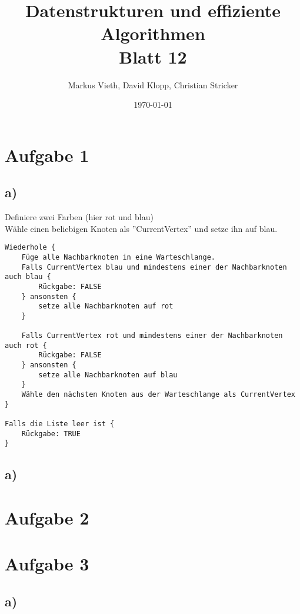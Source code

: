 \documentclass[a4paper,11pt,twoside]{scrartcl}
\title{Datenstrukturen und effiziente Algorithmen\\ Blatt 12}
\author{Markus Vieth, David Klopp, Christian Stricker}
\date{\today}
\begin{document}
\maketitle
\cleardoublepage
\pagestyle{myheadings}

\section*{Aufgabe 1}
\subsection*{a)} 
Definiere zwei Farben (hier rot und blau)\\
Wähle einen beliebigen Knoten als ''CurrentVertex'' und setze ihn auf blau.\\

\begin{lstlisting}
Wiederhole {
	Füge alle Nachbarknoten in eine Warteschlange.
	Falls CurrentVertex blau und mindestens einer der Nachbarknoten auch blau {
		Rückgabe: FALSE
	} ansonsten {
		setze alle Nachbarknoten auf rot
	}
	
	Falls CurrentVertex rot und mindestens einer der Nachbarknoten auch rot {
		Rückgabe: FALSE
	} ansonsten {
		setze alle Nachbarknoten auf blau
	}
	Wähle den nächsten Knoten aus der Warteschlange als CurrentVertex
}

Falls die Liste leer ist {
	Rückgabe: TRUE
}
\end{lstlisting}

\subsection*{a)} 



\section*{Aufgabe 2}


\section*{Aufgabe 3}
\subsection*{a)} 
\end{document}
